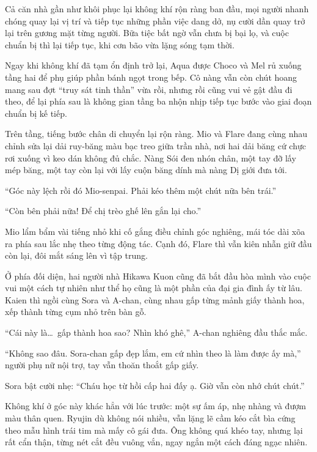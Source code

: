 \documentclass[../main.tex]{subfiles}
\begin{document}
Cả căn nhà gần như khôi phục lại không khí rộn ràng ban đầu, mọi người nhanh chóng quay lại vị trí và tiếp tục những phần việc dang dở, nụ cười dần quay trở lại trên gương mặt từng người. Bữa tiệc bất ngờ vẫn chưa bị bại lọ, và cuộc chuẩn bị thì lại tiếp tục, khi cơn bão vừa lặng sóng tạm thời.

\ct

Ngay khi không khí đã tạm ổn định trở lại, Aqua được Choco và Mel rủ xuống tầng hai để phụ giúp phần bánh ngọt trong bếp. Cô nàng vẫn còn chút hoang mang sau đợt ``truy sát tinh thần'' vừa rồi, nhưng rồi cũng vui vẻ gật đầu đi theo, để lại phía sau là không gian tầng ba nhộn nhịp tiếp tục bước vào giai đoạn chuẩn bị kế tiếp.

Trên tầng, tiếng bước chân di chuyển lại rộn ràng. Mio và Flare đang cùng nhau chỉnh sửa lại dải ruy-băng màu bạc treo giữa trần nhà, nơi hai dải băng cứ chực rơi xuống vì keo dán không đủ chắc. Nàng Sói đen nhón chân, một tay đỡ lấy mép băng, một tay còn lại với lấy cuộn băng dính mà nàng Dị giới đưa tới.

``Góc này lệch rồi đó Mio-senpai. Phải kéo thêm một chút nữa bên trái.''

``Còn bên phải nữa! Để chị trèo ghế lên gắn lại cho.''

Mio lẩm bẩm vài tiếng nhỏ khi cố gắng điều chỉnh góc nghiêng, mái tóc dài xõa ra phía sau lắc nhẹ theo từng động tác. Cạnh đó, Flare thì vẫn kiên nhẫn giữ đầu còn lại, đôi mắt sáng lên vì tập trung.

Ở phía đối diện, hai người nhà Hikawa Kuon cũng đã bắt đầu hòa mình vào cuộc vui một cách tự nhiên như thể họ cũng là một phần của đại gia đình ấy từ lâu. Kaien thì ngồi cùng Sora và A-chan, cùng nhau gấp từng mảnh giấy thành hoa, xếp thành từng cụm nhỏ trên bàn gỗ.

``Cái này là\dots\ gấp thành hoa sao? Nhìn khó ghê,'' A-chan nghiêng đầu thắc mắc.

``Không sao đâu. Sora-chan gấp đẹp lắm, em cứ nhìn theo là làm được ấy mà,'' người phụ nữ nội trợ, tay vẫn thoăn thoắt gấp giấy.

Sora bật cười nhẹ: ``Cháu học từ hồi cấp hai đấy ạ. Giờ vẫn còn nhớ chút chút.''

Không khí ở góc này khác hẳn với lúc trước: một sự ấm áp, nhẹ nhàng và đượm màu thân quen. Ryujin dù không nói nhiều, vẫn lặng lẽ cầm kéo cắt bìa cứng theo mẫu hình trái tim mà mấy cô gái đưa. Ông không quá khéo tay, nhưng lại rất cẩn thận, từng nét cắt đều vuông vắn, ngay ngắn một cách đáng ngạc nhiên.
\end{document}
